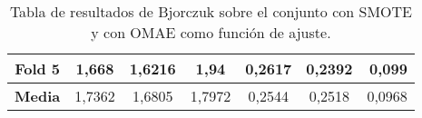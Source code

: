 \begin{table}[H]
{\begin{tabular}{|crrrrrr|}
\multicolumn{1}{|c|}{\textbf{Fold 5}} & \multicolumn{1}{c|}{1,668}             & \multicolumn{1}{c|}{1,6216}              & \multicolumn{1}{c|}{1,94}           & \multicolumn{1}{c|}{0,2617}            & \multicolumn{1}{c|}{0,2392}              & 0,099                              \\ \hline
\multicolumn{1}{|c|}{\textbf{Media}}  & \multicolumn{1}{c|}{1,7362}           & \multicolumn{1}{c|}{1,6805}             & \multicolumn{1}{c|}{1,7972}        & \multicolumn{1}{c|}{0,2544}           & \multicolumn{1}{c|}{0,2518}              & 0,0968                            \\ \hline
\end{tabular}%
}
\caption{Tabla de resultados de Bjorczuk sobre el conjunto con SMOTE y con OMAE como función de ajuste.}\label{tablaBJORCZUKconSMOTEconOMAE}
\end{table}


